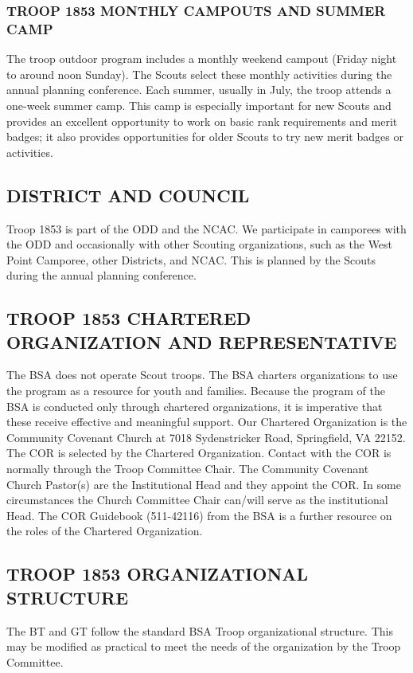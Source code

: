 \documentclass{ltxguide}
\begin{document}
\subsubsection{TROOP 1853 MONTHLY CAMPOUTS AND SUMMER CAMP}
The troop outdoor program includes a monthly weekend campout (Friday night to around noon Sunday). The Scouts select these monthly activities during the annual planning conference. Each summer, usually in July, the troop attends a one-week summer camp. This camp is especially important for new Scouts and provides an excellent opportunity to work on basic rank requirements and merit badges; it also provides opportunities for older Scouts to try new merit badges or activities.

\subsection{DISTRICT AND COUNCIL}
Troop 1853 is part of the \ac{ODD} and the \ac{NCAC}. We participate in camporees with the \ac{ODD} and occasionally with other Scouting organizations, such as the West Point Camporee, other Districts, and \ac{NCAC}. This is planned by the Scouts during the annual planning conference.

\subsection{TROOP 1853 CHARTERED ORGANIZATION AND REPRESENTATIVE}
The \ac{BSA} does not operate Scout troops. The \ac{BSA} charters organizations to use the program as a resource for youth and families. Because the program of the \ac{BSA} is conducted only through chartered organizations, it is imperative that these  receive effective and meaningful support. Our Chartered Organization is the Community Covenant Church at 7018 Sydenstricker Road, Springfield, VA 22152. The \ac{COR} is selected by the Chartered Organization. Contact with the \ac{COR} is normally through the Troop Committee Chair. The Community Covenant Church Pastor(s) are the Institutional Head and they appoint the \ac{COR}. In some circumstances the Church Committee Chair can/will serve as the institutional Head. The \ac{COR} Guidebook (511-42116) from the \ac{BSA} is a further resource on the roles of the Chartered Organization.

\subsection{TROOP 1853 ORGANIZATIONAL STRUCTURE}
The \ac{BT} and \ac{GT} follow the standard \ac{BSA} Troop organizational structure. This may be modified as practical to meet the needs of the organization by the Troop Committee.
\end{document}
